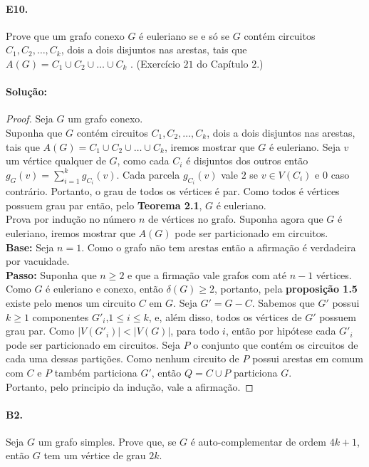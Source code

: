\documentclass[11pt,a4paper,notitlepage]{exam}
\begin{document}
\paragraph{E10.}Prove que um grafo conexo $G$ é euleriano se e só se $G$ contém circuitos $C_1 , C_2 , \dots , C_k$, dois a
dois disjuntos nas arestas, tais que $A(G) = C_1 \cup C_2 \cup \dots \cup C_k$ . (Exercício $21$ do Capítulo $2$.)
\paragraph*{Solução:}
\begin{proof}
  Seja $G$ um grafo conexo.\\
  Suponha que $G$ contém circuitos $C_1 , C_2 , \dots , C_k$, dois a dois disjuntos nas arestas, tais que $A(G) = C_1 \cup C_2 \cup \dots \cup C_k$, iremos mostrar que $G$ é euleriano. Seja $v$ um vértice qualquer de $G$, como cada $C_i$ é disjuntos dos outros então $g_G(v) = \sum_{i=1}^k g_{C_i}(v)$. Cada parcela $g_{C_i}(v)$ vale $2$ se $v \in V(C_i)$ e $0$ caso contrário. Portanto, o grau de todos os vértices é par. Como todos é vértices possuem grau par então, pelo \textbf{Teorema 2.1}, $G$ é euleriano.\\
  Prova por indução no número $n$ de vértices no grafo. Suponha agora que $G$ é euleriano, iremos mostrar que $A(G)$ pode ser particionado em circuitos.\\
  \textbf{Base:} Seja $n = 1$. Como o grafo não tem arestas então a afirmação é verdadeira por vacuidade.\\
  \textbf{Passo:} Suponha que $n\geq 2$ e que a firmação vale grafos com até $n-1$ vértices. Como $G$ é euleriano e conexo, então $\delta(G) \geq 2$, portanto, pela \textbf{proposição 1.5} existe pelo menos um circuito $C$ em $G$. Seja $G' = G - C$. Sabemos que $G'$ possui $k \geq 1$ componentes $G'_i$,$1 \leq i \leq k$, e, além disso, todos os vértices de $G'$ possuem grau par. Como $|V(G'_i)| < |V(G)|$, para todo $i$, então por hipótese cada $G'_i$ pode ser particionado em circuitos. Seja $P$ o conjunto que contém os circuitos de cada uma dessas partições. Como nenhum circuito de $P$ possui arestas em comum com $C$ e $P$ também particiona $G'$, então $Q = C\cup P$ particiona $G$.\\
  Portanto, pelo principio da indução, vale a afirmação.
\end{proof}
\paragraph{B2.}Seja $G$ um grafo simples. Prove que, se $G$ é auto-complementar de ordem $4k + 1$, então $G$ tem
um vértice de grau $2k$.
\end{document}
